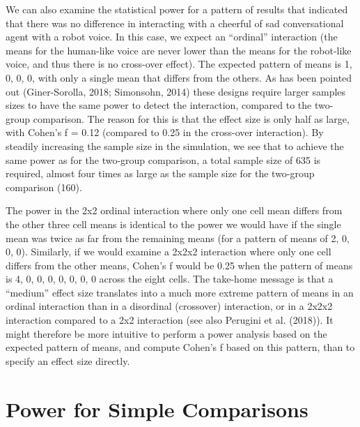 \documentclass[,jou,floatsintext]{apa6}
\begin{document}
We can also examine the statistical power for a pattern of results that indicated that there was no difference in interacting with a cheerful of sad conversational agent with a robot voice.
In this case, we expect an \enquote{ordinal} interaction (the means for the human-like voice are never lower than the means for the robot-like voice, and thus there is no cross-over effect).
The expected pattern of means is 1, 0, 0, 0, with only a single mean that differs from the others.
As has been pointed out (Giner-Sorolla, 2018; Simonsohn, 2014) these designs require larger samples sizes to have the same power to detect the interaction, compared to the two-group comparison.
The reason for this is that the effect size is only half as large, with Cohen's f = 0.12
(compared to 0.25 in the cross-over interaction).
By steadily increasing the sample size in the simulation, we see that to achieve the same power as for the two-group comparison, a total sample size of 635 is required, almost four times as large as the sample size for the two-group comparison (160).

The power in the 2x2 ordinal interaction where only one cell mean differs from the other three cell means is identical to the power we would have if the single mean was twice as far from the remaining means (for a pattern of means of 2, 0, 0, 0).
Similarly, if we would examine a 2x2x2 interaction where only one cell differs from the other means, Cohen's f would be 0.25 when the pattern of means is 4, 0, 0, 0, 0, 0, 0, 0 across the eight cells.
The take-home message is that a \enquote{medium} effect size translates into a much more extreme pattern of means in an ordinal interaction than in a disordinal (crossover) interaction, or in a 2x2x2 interaction compared to a 2x2 interaction (see also Perugini et al. (2018)).
It might therefore be more intuitive to perform a power analysis based on the expected pattern of means, and compute Cohen's f based on this pattern, than to specify an effect size directly.

\hypertarget{power-for-simple-comparisons}{%
\section{Power for Simple Comparisons}\label{power-for-simple-comparisons}}
\end{document}

